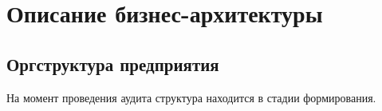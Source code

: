 %
%
\newpage

\chapter{Описание бизнес-архитектуры}

\section{Оргструктура предприятия}

На момент проведения аудита структура находится в стадии формирования.

